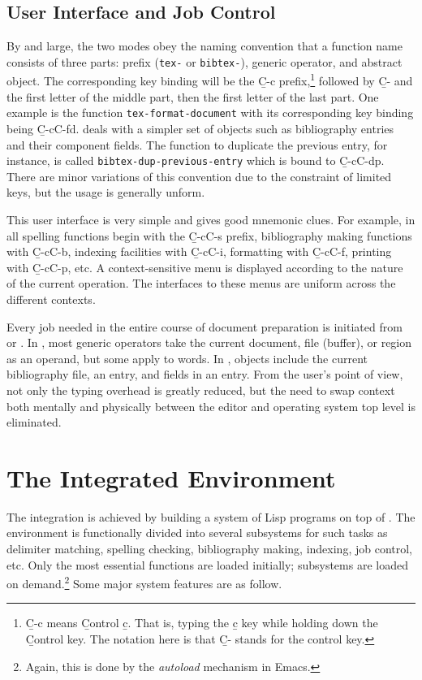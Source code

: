 \subsection{User Interface and Job Control}
By and large, the two modes obey the naming convention that a function name
consists of three parts: prefix (\verb|tex-| or \verb|bibtex-|),
generic operator, and abstract object.
The corresponding key binding will be the {\b C-c} prefix,\footnote{{\b C-c}
means {\b C}ontrol {\b c}.  That is, typing the {\b c} key while holding down
the {\b C}ontrol key.  The notation
here is that {\b C-} stands for the control key.} followed
by {\b C-}
and the first letter of the middle part, then the first letter of the last 
part.  One example is the {\TM} function \verb|tex-format-document| 
with its corresponding key binding being {\b C-c{\s}C-f{\s}d}.
{\BM} deals with a simpler set of objects such as bibliography entries and 
their component fields.
The function to duplicate the previous entry, for instance, is called 
\verb|bibtex-dup-previous-entry| which is bound to {\b C-c{\s}C-d{\s}p}.
There are minor variations of this convention
due to the constraint of limited keys, but the usage is generally unform.

This user interface is very simple and gives good mnemonic clues.
For example, in {\TM} all spelling functions begin with the {\b C-c{\s}C-s}
prefix, bibliography making functions with {\b C-c{\s}C-b},
indexing facilities with {\b C-c{\s}C-i}, formatting with {\b C-c{\s}C-f},
printing with {\b C-c{\s}C-p}, etc.
A context-sensitive menu is displayed according to the nature of the
current operation.  The interfaces to these menus are
uniform across the different contexts.
 
Every job needed in the entire course of document preparation
is initiated from {\TM} or {\BM}.  In {\TM}, most generic operators take the
current document, file (buffer), or region as an operand, but some apply
to words.
In {\BM}, objects include the current bibliography file, an entry, and fields
in an entry.
From the user's point of view, not only the typing overhead is greatly reduced,
but the need to swap context both mentally and physically
between the editor and operating system top level is eliminated.

\section{The Integrated Environment}
The integration is achieved by building a system of
Lisp programs on top of {\emacs}.
The environment is functionally
divided into several subsystems for such tasks as delimiter matching,
spelling checking, bibliography making,
indexing, job control, etc.  Only the most essential functions are loaded
initially; subsystems are loaded on demand.\footnote{Again, this is
done by the {\it autoload\/} mechanism in Emacs.}
Some major system features are as follow.

